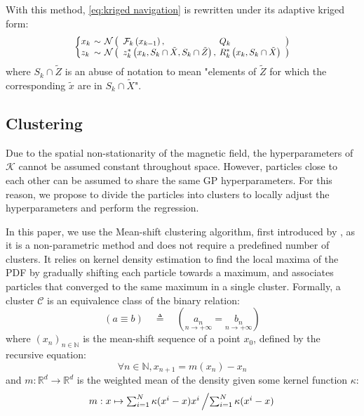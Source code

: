 \documentclass[conference]{IEEEtran}
\begin{document}
With this method, \eqref{eq:kriged navigation} is rewritten under its adaptive kriged form:
\begin{equation}
\scalebox{0.9}{\setlength\arraycolsep{2pt}
$\hspace*{-2mm}\left\{\begin{matrix*}[l]
x_k&\sim&\mathcal{N}\left(\vphantom{\tilde{X}}\right.&\mathcal{F}_k\left(x_{k-1}\right),&Q_k&\left.\vphantom{\tilde{X}}\right)\\
z_k&\sim&\mathcal{N}\left(\vphantom{\tilde{X}}\right.&z^*_k\left(x_k,S_k\cap\tilde{X},S_k\cap\tilde{Z}\right),&R^*_k\left(x_k,S_k\cap\tilde{X}\right)&\left.\vphantom{\tilde{X}}\right)
\end{matrix*}\right.\hspace*{-1mm}$}\label{eq:AK navigation}
\end{equation}
where $S_k\cap\tilde{Z}$ is an abuse of notation to mean "elements of $\tilde{Z}$ for which the corresponding $\tilde{x}$ are in $S_k\cap\tilde{X}$".

\subsection{Clustering}\label{sec:clustering}

Due to the spatial non-stationarity of the magnetic field, the hyperparameters of $\mathcal{K}$ cannot be assumed constant throughout space. However, particles close to each other can be assumed to share the same GP hyperparameters. For this reason, we propose to divide the particles into clusters to locally adjust the hyperparameters and perform the regression.

In this paper, we use the Mean-shift clustering algorithm, first introduced by \cite{bib:mean-shift}, as it is a non-parametric method and does not require a predefined number of clusters. It relies on kernel density estimation to find the local maxima of the PDF by gradually shifting each particle towards a maximum, and associates particles that converged to the same maximum in a single cluster. Formally, a cluster $\mathcal{C}$ is an equivalence class of the binary relation:
\begin{equation}
\left(a\equiv b\right)\quad\triangleq\quad\left(\underset{n\rightarrow+\infty}{a_n}=\underset{n\rightarrow+\infty}{b_n}\right)\label{eq:clustering}
\end{equation}
where $(x_n)_{n\in\mathbb{N}}$ is the mean-shift sequence of a point $x_0$, defined by the recursive equation:
\begin{equation}
\forall n\in\mathbb{N},x_{n+1}=m(x_n)-x_n
\end{equation}
and $m:\mathbb{R}^d\rightarrow\mathbb{R}^d$ is the weighted mean of the density given some kernel function $\kappa$:
\begin{equation}
\textstyle m:x\mapsto\sum_{i=1}^N\kappa(x^i-x)x^i\left/\sum_{i=1}^N\kappa(x^i-x)\right.
\end{equation}
\end{document}
